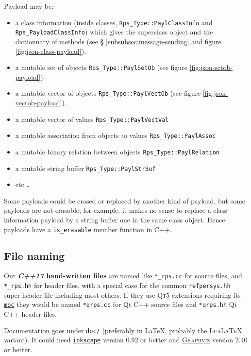\documentclass[11pt,a4paper,svgnames]{article}
\begin{document}
Payload may be:
\begin{itemize}
\item a class information (inside classes,
  \texttt{Rps\_Type::PaylClassInfo} and \texttt{Rps\_PayloadClassInfo}) which gives the superclass object
  and the dictionnary of methods (see \S
  \ref{subsubsec:message-sending} and figure \ref{fig:json-class-payload}).
\item a mutable set of objects  \texttt{Rps\_Type::PaylSetOb} (see figure \ref{fig:json-setob-payload}).
\item a mutable vector of objects  \texttt{Rps\_Type::PaylVectOb} (see figure \ref{fig:json-vectob-payload}).
\item a mutable vector of values  \texttt{Rps\_Type::PaylVectVal}
\item a mutable association from objects to values
  \texttt{Rps\_Type::PaylAssoc}
\item a mutable binary relation between objects
  \texttt{Rps\_Type::PaylRelation}
\item a mutable string buffer
  \texttt{Rps\_Type::PaylStrBuf}
  \item etc  \ldots
\end{itemize}

Some payloads could be erased or replaced by another kind of payload,
but some payloads are not erasable; for example, it makes no sense to
replace a class information payload by a string buffer one in the same
class object. Hence payloads have a \texttt{is\_erasable} member
function in C++.

\bigskip
\subsection{File naming}
\label{subsec:file-naming}

Our \textbf{\textit{C++17} hand-written files} are named like
\texttt{*\_rps.cc} for source files, and \texttt{*\_rps.hh} for header
files, with a special case for the common \texttt{refpersys.hh}
super-header file including most others.  If they use \textsc{Qt5}
extensions requiring its
\href{https://doc.qt.io/qt-5/moc.html}{\texttt{moc}} they would be
named \texttt{*qrps.cc} for Qt C++ source files and \texttt{*qrps.hh}
Qt C++ header files.

Documentation goes under \texttt{doc/} (preferably in \LaTeX, probably
the \textsc{LuaLaTeX} variant). It could need
\href{https://inkscape.org/}{\texttt{inkscape}} version 0.92 or better and
\href{https://www.graphviz.org/}{\textsc{Graphviz}} version 2.40 or
better.
\end{document}
